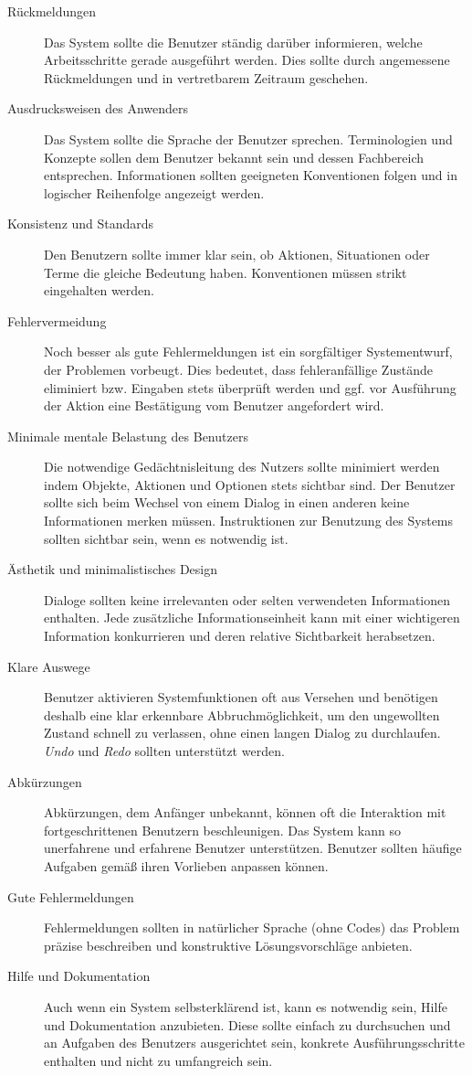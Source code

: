 \begin{description}
	\item[Rückmeldungen]{Das System sollte die Benutzer ständig darüber informieren, welche Arbeitsschritte gerade ausgeführt werden. Dies sollte durch angemessene Rückmeldungen und in vertretbarem Zeitraum geschehen.}
	
	\newpage
	\item[Ausdrucksweisen des Anwenders]{Das System sollte die Sprache der Benutzer sprechen. Terminologien und Konzepte sollen dem Benutzer bekannt sein und dessen Fachbereich entsprechen. Informationen sollten geeigneten Konventionen folgen und in logischer Reihenfolge angezeigt werden.}
	\item[Konsistenz und Standards]{Den Benutzern sollte immer klar sein, ob Aktionen, Situationen oder Terme die gleiche Bedeutung haben. Konventionen müssen strikt eingehalten werden.}
	\item[Fehlervermeidung]{Noch besser als gute Fehlermeldungen ist ein sorgfältiger Systementwurf, der Problemen vorbeugt. Dies bedeutet, dass fehleranfällige Zustände eliminiert bzw. Eingaben stets überprüft  werden und ggf. vor Ausführung der Aktion eine Bestätigung vom Benutzer angefordert wird.}
	\item[Minimale mentale Belastung des Benutzers]{Die notwendige Gedächtnisleitung des Nutzers sollte minimiert werden indem Objekte, Aktionen und Optionen stets sichtbar sind. Der Benutzer sollte sich beim Wechsel von einem Dialog in einen anderen keine Informationen  merken müssen. Instruktionen zur Benutzung des Systems sollten sichtbar sein, wenn es notwendig ist.}
	\item[Ästhetik und minimalistisches Design]{Dialoge sollten keine irrelevanten oder selten verwendeten Informationen enthalten. Jede zusätzliche Informationseinheit kann mit einer wichtigeren Information konkurrieren und deren relative Sichtbarkeit herabsetzen.}
	\item[Klare Auswege]{Benutzer aktivieren Systemfunktionen oft aus Versehen und benötigen deshalb eine klar erkennbare Abbruchmöglichkeit, um den ungewollten Zustand schnell zu verlassen, ohne einen langen Dialog zu durchlaufen. \emph{Undo} und \emph{Redo} sollten unterstützt werden.}
	\item[Abkürzungen]{
	Abkürzungen, dem Anfänger unbekannt, können oft die Interaktion mit fortgeschrittenen Benutzern beschleunigen. Das System kann so unerfahrene und erfahrene Benutzer unterstützen. Benutzer sollten häufige Aufgaben gemäß ihren Vorlieben anpassen können.}
	\item[Gute Fehlermeldungen]{Fehlermeldungen sollten in natürlicher Sprache (ohne Codes) das Problem präzise beschreiben und konstruktive Lösungsvorschläge anbieten.}
	\item[Hilfe und Dokumentation]{Auch wenn ein System selbsterklärend ist, kann es notwendig sein, Hilfe und Dokumentation anzubieten. Diese sollte einfach zu durchsuchen und an Aufgaben des Benutzers ausgerichtet sein, konkrete Ausführungsschritte enthalten und nicht zu umfangreich sein.}
\end{description}

